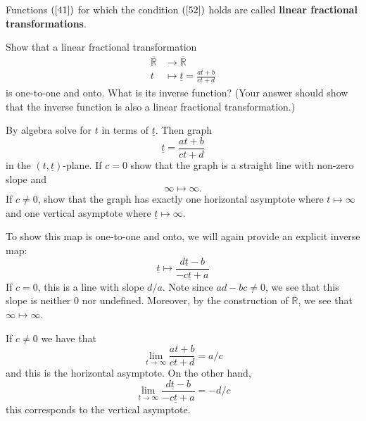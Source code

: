 \documentclass{ximera}
\begin{document}
\begin{definition}
Functions $\left( \ref{41}\right) $ for which the condition $\left(
\ref{52}\right)  $ holds are called \textbf{linear fractional transformations}.
\end{definition}


\begin{problem}
Show that a linear fractional transformation%
\begin{align*}
\overline{\mathbb{R}} &\rightarrow\overline{\mathbb{R}}\\
t &\mapsto\underline{t} =\frac{at+b}{ct+d}%
\end{align*}
is one-to-one and onto. What is its inverse function? (Your answer should show that
the inverse function is also a linear fractional transformation.)

\begin{hint}
By algebra solve for $t$ in terms of $\underline{t}$. Then graph%
\[
\underline{t}=\frac{at+b}{ct+d}%
\]
in the $\left(  t,\underline{t}\right)  $-plane. If $c=0$ show that the graph
is a straight line with non-zero slope and%
\[
\infty\mapsto\infty.
\]
If $c\neq0$, show that the graph has exactly one horizontal asymptote where
$t\mapsto\infty$ and one vertical asymptote where $\underline{t}\mapsto\infty$.
\end{hint}
\begin{freeResponse}
To show this map is one-to-one and onto, we will again provide an
explicit inverse map:
\[
\underline{t} \mapsto \frac{d \underline{t}-b}{-c \underline{t} +a}
\]
If $c= 0$, this is a line with slope $d/a$. Note since $ad-bc \ne 0$,
we see that this slope is neither $0$ nor undefined. Moreover, by the construction of $\overline{\mathbb{R}}$, we see that $\infty\mapsto\infty$.

If $c\ne0$ we have that
\[
\lim_{t\to \infty} \frac{at+b}{ct+d}  = a/c
\]
and this is the horizontal asymptote. On the other hand, 
\[
\lim_{\underline{t}\to\infty} \frac{d \underline{t}-b}{-c \underline{t} +a} = -d/c
\]
this corresponds to the vertical asymptote. 
\end{freeResponse}
\end{problem}
\end{document}
